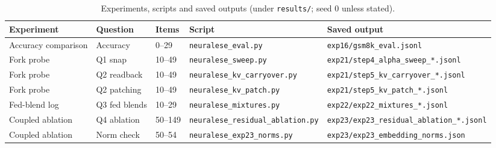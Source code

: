 \begin{table}[t]
\centering
\footnotesize
\caption{Experiments, scripts and saved outputs (under \texttt{results/}; seed 0 unless stated).}\label{tab:repro}
\setlength{\tabcolsep}{4pt}
\begin{tabular}{@{}lllll@{}}
\toprule
Experiment & Question & Items & Script & Saved output \\
\midrule
Accuracy comparison & Accuracy & 0--29 & \texttt{neuralese\_eval.py} & \texttt{exp16/gsm8k\_eval.jsonl} \\ %
Fork probe & Q1 snap & 10--49 & \texttt{neuralese\_sweep.py} & \texttt{exp21/step4\_alpha\_sweep\_*.jsonl} \\ %
Fork probe & Q2 readback & 10--49 & \texttt{neuralese\_kv\_carryover.py} & \texttt{exp21/step5\_kv\_carryover\_*.jsonl} \\ %
Fork probe & Q2 patching & 10--49 & \texttt{neuralese\_kv\_patch.py} & \texttt{exp21/step5\_kv\_patch\_*.jsonl} \\ %
Fed-blend log & Q3 fed blends & 10--29 & \texttt{neuralese\_mixtures.py} & \texttt{exp22/exp22\_mixtures\_*.jsonl} \\ %
Coupled ablation & Q4 ablation & 50--149 & \texttt{neuralese\_residual\_ablation.py} & \texttt{exp23/exp23\_residual\_ablation\_*.jsonl} \\ %
Coupled ablation & Norm check & 50--54 & \texttt{neuralese\_exp23\_norms.py} & \texttt{exp23/exp23\_embedding\_norms.json} \\ %
\bottomrule
\end{tabular}
\end{table}

